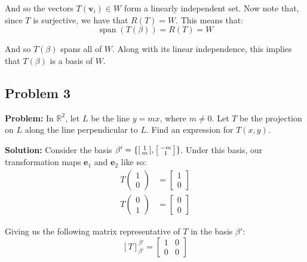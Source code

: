\documentclass{article}
\renewcommand\vec{\mathbf}
\newcommand{\icol}[1]{%
  \begin{bsmallmatrix}#1\end{bsmallmatrix}%
}
\begin{document}
And so the vectors $T(\vec v_i)\in W$ form a linearly independent set. Now note that, since $T$ is surjective, we have that $R(T)=W$. This means that:
$$\operatorname{span}(T(\beta))=R(T)=W$$

And so $T(\beta)$ spans all of $W$. Along with its linear independence, this implies that $T(\beta)$ is a basis of $W$.

\subsection*{Problem 3}
\noindent\textbf{Problem:} In $\mathbb R^2$, let $L$ be the line $y = mx$, where $m\not= 0$. Let $T$ be the projection on $L$ along the line perpendicular to $L$. Find an expression for $T(x, y)$.
\bigskip

\noindent\textbf{Solution:} Consider the basis $\beta'=\{\icol{1\\m},\icol{-m\\1}\}$. Under this basis, our transformation maps $\vec e_1$ and $\vec e_2$ like so:
\begin{align*}
  T\begin{pmatrix}
    1\\0
  \end{pmatrix}&=\begin{bmatrix}
    1\\0
  \end{bmatrix}\\
  T\begin{pmatrix}
    0\\1
  \end{pmatrix}&=\begin{bmatrix}
    0\\0
  \end{bmatrix}
\end{align*}

Giving us the following matrix representative of $T$ in the basis $\beta'$:
$$[T]_{\beta'}^{\beta'}=\begin{bmatrix}
  1&0\\0&0
\end{bmatrix}$$
\end{document}
